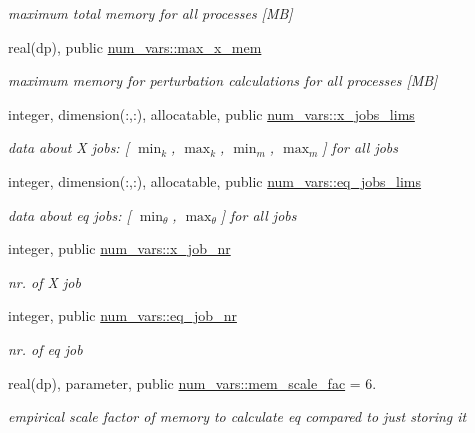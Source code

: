 \begin{DoxyCompactItemize}
\begin{DoxyCompactList}\small\item\em maximum total memory for all processes \mbox{[}MB\mbox{]} \end{DoxyCompactList}\item 
real(dp), public \hyperlink{namespacenum__vars_af86827817455d27248f5660c3d616283}{num\+\_\+vars\+::max\+\_\+x\+\_\+mem}
\begin{DoxyCompactList}\small\item\em maximum memory for perturbation calculations for all processes \mbox{[}MB\mbox{]} \end{DoxyCompactList}\item 
integer, dimension(\+:,\+:), allocatable, public \hyperlink{namespacenum__vars_a476c029a4a53aa1f707d54d18d3c80a0}{num\+\_\+vars\+::x\+\_\+jobs\+\_\+lims}
\begin{DoxyCompactList}\small\item\em data about X jobs\+: \mbox{[} $\min_k$, $\max_k$, $\min_m$, $\max_m$\mbox{]} for all jobs \end{DoxyCompactList}\item 
integer, dimension(\+:,\+:), allocatable, public \hyperlink{namespacenum__vars_a725aecf3a6f55fee53a5fe3b759d6a25}{num\+\_\+vars\+::eq\+\_\+jobs\+\_\+lims}
\begin{DoxyCompactList}\small\item\em data about eq jobs\+: \mbox{[} $\min_\theta$, $\max_\theta$\mbox{]} for all jobs \end{DoxyCompactList}\item 
integer, public \hyperlink{namespacenum__vars_a9df427f6582f4528652b3607d1c681b3}{num\+\_\+vars\+::x\+\_\+job\+\_\+nr}
\begin{DoxyCompactList}\small\item\em nr. of X job \end{DoxyCompactList}\item 
integer, public \hyperlink{namespacenum__vars_adfff3a032694d6c26e780019772d4cc1}{num\+\_\+vars\+::eq\+\_\+job\+\_\+nr}
\begin{DoxyCompactList}\small\item\em nr. of eq job \end{DoxyCompactList}\item 
real(dp), parameter, public \hyperlink{namespacenum__vars_a37e3db17f8acca3f59bb15381848aa6e}{num\+\_\+vars\+::mem\+\_\+scale\+\_\+fac} = 6.
\begin{DoxyCompactList}\small\item\em empirical scale factor of memory to calculate eq compared to just storing it \end{DoxyCompactList}\item 

\end{DoxyCompactItemize}
